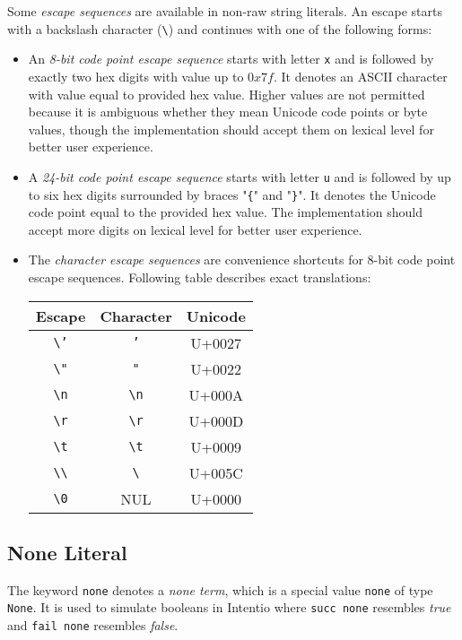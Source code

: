 Some \emph{escape sequences} are available in non-raw string literals. An escape starts with a backslash character (\texttt{\textbackslash}) and continues with one of the following forms:

\begin{itemize}
  \item An \emph{8-bit code point escape sequence} starts with letter \texttt{x} and is followed by exactly two hex digits with value up to \(0x7f\). It denotes an ASCII character with value equal to provided hex value. Higher values are not permitted because it is ambiguous whether they mean Unicode code points or byte values, though the implementation should accept them on lexical level for better user experience.
  \item A \emph{24-bit code point escape sequence} starts with letter \texttt{u} and is followed by up to six hex digits surrounded by braces "\texttt{\{}" and "\texttt{\}}". It denotes the Unicode code point equal to the provided hex value. The implementation should accept more digits on lexical level for better user experience.
  \item The \emph{character escape sequences} are convenience shortcuts for 8-bit code point escape sequences. Following table describes exact translations:

    \begin{center}
    \begin{tabular}{c|c|c}
      Escape & Character & Unicode \\
      \hline
      \texttt{\textbackslash '} & \texttt{'} & U+0027 \\
      \texttt{\textbackslash "} & \texttt{"} & U+0022 \\
      \texttt{\textbackslash n} & \texttt{\textbackslash n} & U+000A \\
      \texttt{\textbackslash r} & \texttt{\textbackslash r} & U+000D \\
      \texttt{\textbackslash t} & \texttt{\textbackslash t} & U+0009 \\
      \texttt{\textbackslash \textbackslash} & \texttt{\textbackslash} & U+005C \\
      \texttt{\textbackslash 0} & NUL & U+0000 \\
    \end{tabular}
    \end{center}
\end{itemize}

\subsection{None Literal}

The keyword \lstinline{none} denotes a \emph{none term}, which is a special value \lstinline{none} of type \lstinline{None}. It is used to simulate booleans in Intentio where \lstinline{succ none} resembles \emph{true} and \lstinline{fail none} resembles \emph{false}.
